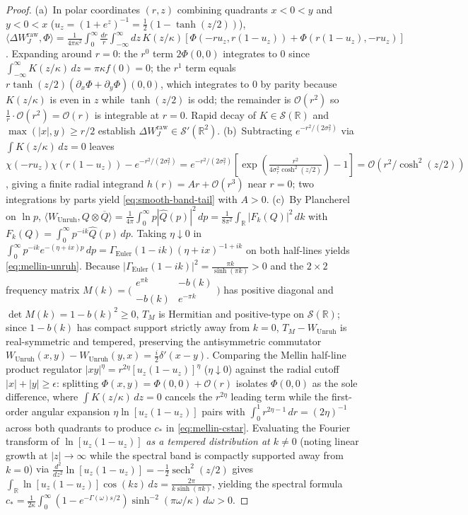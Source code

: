 \documentclass[11pt,a4paper]{article}
\theoremstyle{definition}
\theoremstyle{remark}
\newcommand{\bbR}{\mathbb{R}}
\newcommand{\1}{\mathbf{1}}
\begin{document}
\begin{proof}
(a)~In polar coordinates $(r,z)$ combining quadrants $x<0<y$ and $y<0<x$ ($u_z=(1+e^z)^{-1}=\frac{1}{2}(1-\tanh(z/2))$), $\langle\Delta W_J^{\mathrm{raw}},\Phi\rangle = \frac{1}{4\pi\kappa^2}\int_0^\infty\frac{dr}{r}\int_{-\infty}^\infty dz\,K(z/\kappa)[\Phi(-ru_z,r(1-u_z))+\Phi(r(1-u_z),-ru_z)]$. Expanding around $r=0$: the $r^0$ term $2\Phi(0,0)$ integrates to $0$ since $\int_{-\infty}^\infty K(z/\kappa)\,dz = \pi\kappa f(0) = 0$; the $r^1$ term equals $r\tanh(z/2)(\partial_x\Phi+\partial_y\Phi)(0,0)$, which integrates to $0$ by parity because $K(z/\kappa)$ is even in $z$ while $\tanh(z/2)$ is odd; the remainder is $\mathcal{O}(r^2)$ so $\frac{1}{r}\cdot\mathcal{O}(r^2)=\mathcal{O}(r)$ is integrable at $r=0$. Rapid decay of $K\in\mathcal{S}(\bbR)$ and $\max(|x|,y)\ge r/2$ establish $\Delta W_J^{\mathrm{raw}}\in\mathcal{S}'(\bbR^2)$.
(b)~Subtracting $e^{-r^2/(2\sigma_\tau^2)}$ via $\int K(z/\kappa)\,dz=0$ leaves $\chi(-ru_z)\chi(r(1-u_z))-e^{-r^2/(2\sigma_\tau^2)} = e^{-r^2/(2\sigma_\tau^2)}[\exp(\frac{r^2}{4\sigma_\tau^2\cosh^2(z/2)})-1] = \mathcal{O}(r^2/\cosh^2(z/2))$, giving a finite radial integrand $h(r)=Ar+\mathcal{O}(r^3)$ near $r=0$; two integrations by parts yield \eqref{eq:smooth-band-tail} with $A>0$.
(c)~By Plancherel on $\ln p$, $\langle W_{\mathrm{Unruh}},Q\otimes\overline{Q}\rangle = \frac{1}{4\pi}\int_0^\infty p|\widehat{Q}(p)|^2\,dp = \frac{1}{8\pi^2}\int_{\bbR}|F_k(Q)|^2\,dk$ with $F_k(Q)=\int_0^\infty p^{-ik}\widehat{Q}(p)\,dp$. Taking $\eta\downarrow 0$ in $\int_0^\infty p^{-ik}e^{-(\eta+ix)p}\,dp = \Gamma_{\mathrm{Euler}}(1-ik)(\eta+ix)^{-1+ik}$ on both half-lines yields \eqref{eq:mellin-unruh}. Because $|\Gamma_{\mathrm{Euler}}(1-ik)|^2=\frac{\pi k}{\sinh(\pi k)}>0$ and the $2\times 2$ frequency matrix $M(k)=\bigl(\begin{smallmatrix} e^{\pi k} & -b(k) \\ -b(k) & e^{-\pi k}\end{smallmatrix}\bigr)$ has positive diagonal and $\det M(k)=1-b(k)^2\ge 0$, $T_M$ is Hermitian and positive-type on $\mathcal{S}(\bbR)$; since $1-b(k)$ has compact support strictly away from $k=0$, $T_M-W_{\mathrm{Unruh}}$ is real-symmetric and tempered, preserving the antisymmetric commutator $W_{\mathrm{Unruh}}(x,y)-W_{\mathrm{Unruh}}(y,x)=\frac{i}{2}\delta'(x-y)$. Comparing the Mellin half-line product regulator $|xy|^\eta = r^{2\eta}[u_z(1-u_z)]^\eta$ ($\eta\downarrow 0$) against the radial cutoff $|x|+|y|\ge\epsilon$: splitting $\Phi(x,y)=\Phi(0,0)+\mathcal{O}(r)$ isolates $\Phi(0,0)$ as the sole difference, where $\int K(z/\kappa)\,dz=0$ cancels the $r^{2\eta}$ leading term while the first-order angular expansion $\eta\ln[u_z(1-u_z)]$ pairs with $\int_0^1 r^{2\eta-1}\,dr = (2\eta)^{-1}$ across both quadrants to produce $c_*$ in \eqref{eq:mellin-cstar}. Evaluating the Fourier transform of $\ln[u_z(1-u_z)]$ \emph{as a tempered distribution at $k\neq 0$} (noting linear growth at $|z|\to\infty$ while the spectral band is compactly supported away from $k=0$) via $\frac{d^2}{dz^2}\ln[u_z(1-u_z)]=-\frac{1}{2}\operatorname{sech}^2(z/2)$ gives $\int_{\bbR}\ln[u_z(1-u_z)]\cos(kz)\,dz = \frac{2\pi}{k\sinh(\pi k)}$, yielding the spectral formula $c_*=\frac{1}{2\kappa}\int_0^\infty(1-e^{-\Gamma(\omega)s/2})\sinh^{-2}(\pi\omega/\kappa)\,d\omega > 0$.

\end{proof}
\end{document}
